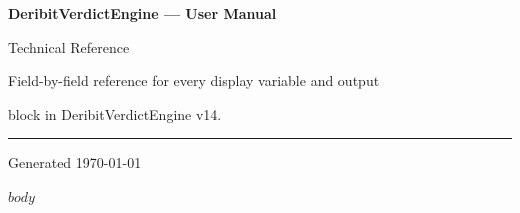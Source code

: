 \documentclass[a4paper,11pt]{article}
\begin{document}
\begin{titlepage}
\thispagestyle{empty}
\noindent
\colorbox{tealcolor}{%
  \begin{minipage}[t][7.5cm]{\paperwidth}%
    \vspace*{2.4cm}%
    \hspace{2.5cm}%
    {\fontsize{24}{30}\selectfont\bfseries\color{white}%
      DeribitVerdictEngine --- User Manual}%
    \par\vspace{0.5cm}%
    \hspace{2.5cm}%
    {\fontsize{14}{18}\selectfont\color{white!85!tealcolor}%
      Technical Reference}%
    \vfill%
  \end{minipage}%
}%
\par
\vspace*{5cm}
\hspace{2.5cm}%
\begin{minipage}{0.7\paperwidth}
  {\fontsize{15}{20}\selectfont\color{darktext}%
    Field-by-field reference for every display variable and output\par
    block in DeribitVerdictEngine v14.}%
  \vspace{1.5em}\par
  {\color{tealcolor}\rule{0.4\paperwidth}{1.5pt}}\par
  \vspace{0.8em}
  {\fontsize{11}{15}\selectfont\color{mutedgray}Generated \today}
\end{minipage}
\restoregeometry
\end{titlepage}

\newpage
\thispagestyle{plain}
\setcounter{tocdepth}{2}
\tableofcontents

\newpage
\setcounter{page}{1}

$body$
\end{document}
